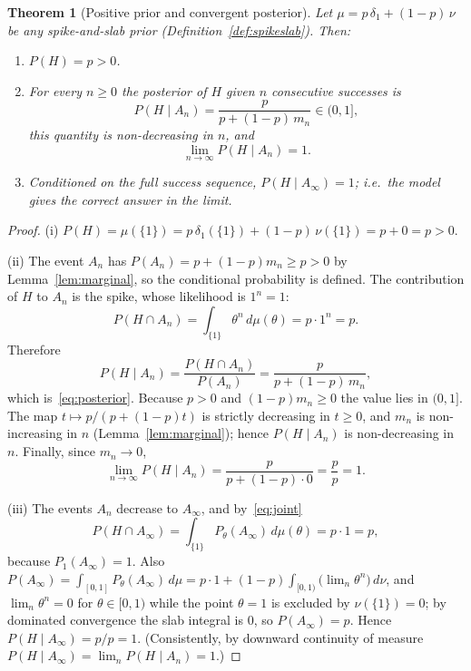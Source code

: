 \documentclass{amsart}
\newtheorem{theorem}{Theorem}
\theoremstyle{definition}
\begin{document}
\begin{theorem}[Positive prior and convergent posterior]\label{thm:main}
Let $\mu=p\,\delta_1+(1-p)\,\nu$ be any spike-and-slab prior
(Definition~\ref{def:spikeslab}). Then:
\begin{enumerate}
\item[\textup{(i)}] $P(H)=p>0$.
\item[\textup{(ii)}] For every $n\ge0$ the posterior of $H$ given $n$ consecutive
successes is
\begin{equation}\label{eq:posterior}
  P(H\mid A_n)=\frac{p}{p+(1-p)\,m_n}\in(0,1],
\end{equation}
this quantity is non-decreasing in $n$, and
\[
  \lim_{n\to\infty}P(H\mid A_n)=1.
\]
\item[\textup{(iii)}] Conditioned on the full success sequence,
$P(H\mid A_\infty)=1$; i.e.\ the model gives the correct answer in the limit.
\end{enumerate}
\end{theorem}

\begin{proof}
(i) $P(H)=\mu(\{1\})=p\,\delta_1(\{1\})+(1-p)\,\nu(\{1\})=p+0=p>0$.

(ii) The event $A_n$ has $P(A_n)=p+(1-p)m_n\ge p>0$ by
Lemma~\ref{lem:marginal}, so the conditional probability is defined. The
contribution of $H$ to $A_n$ is the spike, whose likelihood is $1^n=1$:
\[
  P(H\cap A_n)=\int_{\{1\}}\theta^n\,d\mu(\theta)=p\cdot 1^n=p .
\]
Therefore
\[
  P(H\mid A_n)=\frac{P(H\cap A_n)}{P(A_n)}=\frac{p}{p+(1-p)\,m_n},
\]
which is~\eqref{eq:posterior}. Because $p>0$ and $(1-p)m_n\ge0$ the value lies
in $(0,1]$. The map $t\mapsto p/(p+(1-p)t)$ is strictly decreasing in
$t\ge0$, and $m_n$ is non-increasing in $n$ (Lemma~\ref{lem:marginal}); hence
$P(H\mid A_n)$ is non-decreasing in $n$. Finally, since $m_n\to0$,
\[
  \lim_{n\to\infty}P(H\mid A_n)=\frac{p}{p+(1-p)\cdot 0}=\frac{p}{p}=1 .
\]

(iii) The events $A_n$ decrease to $A_\infty$, and by~\eqref{eq:joint}
\[
  P(H\cap A_\infty)=\int_{\{1\}}P_\theta(A_\infty)\,d\mu(\theta)=p\cdot 1=p,
\]
because $P_1(A_\infty)=1$. Also
$P(A_\infty)=\int_{[0,1]}P_\theta(A_\infty)\,d\mu
=p\cdot1+(1-p)\int_{[0,1)}\big(\lim_n\theta^n\big)\,d\nu$, and
$\lim_n\theta^n=0$ for $\theta\in[0,1)$ while the point $\theta=1$ is
excluded by $\nu(\{1\})=0$; by dominated convergence the slab integral is $0$, so
$P(A_\infty)=p$. Hence $P(H\mid A_\infty)=p/p=1$. (Consistently, by downward
continuity of measure $P(H\mid A_\infty)=\lim_n P(H\mid A_n)=1$.)
\end{proof}
\end{document}
